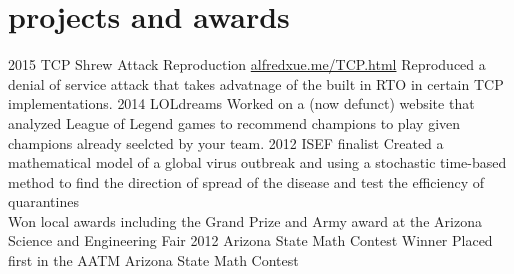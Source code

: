 \documentclass[]{friggeri-cv}
\begin{document}
\section{projects and awards}

\begin{entrylist}
  \entry
    {2015}
    {TCP Shrew Attack Reproduction}
    {\href{http://https://reproducingnetworkresearch.wordpress.com/2015/05/31/cs24415-denial-of-service-using-tcps-rto/}{alfredxue.me/TCP.html}}
    {Reproduced a denial of service attack that takes advatnage of the built in RTO in certain TCP implementations.}
  \entry
    {2014}
    {LOLdreams}
    {}
    {Worked on a (now defunct) website that analyzed League of Legend games to recommend champions to play given champions already seelcted by your team.}
  \entry
    {2012}
    {ISEF finalist}
    {}
    {Created a mathematical model of a global virus outbreak and using a stochastic time-based method to find the direction of spread of the disease and test the efficiency of quarantines\\
    Won local awards including the Grand Prize and Army award at the Arizona Science and Engineering Fair}
  \entry 
    {2012}
    {Arizona State Math Contest Winner}
    {}
    {Placed first in the AATM Arizona State Math Contest}
\end{entrylist}
\end{document}
